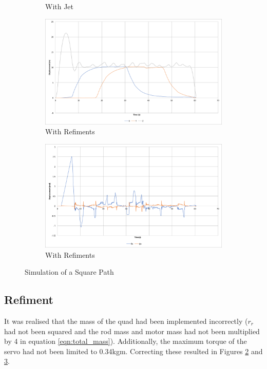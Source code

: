 \documentclass[11pt]{article}
\begin{document}
\begin{figure}[p]
\begin{subfigure}{0.48\textwidth}
        \caption{With Jet}
        \label{fig:square_path_w_jet_angle}
    \end{subfigure}
    \medskip
    \begin{subfigure}{0.48\textwidth}
        \includegraphics[width=\linewidth]{square_path_limited_servos}
        \caption{With Refiments}
        \label{fig:square_path_limited_servos}
    \end{subfigure}\hspace*{\fill}
    \begin{subfigure}{0.48\textwidth}
        \includegraphics[width=\linewidth]{square_path_limited_servos_angle}
        \caption{With Refiments}
        \label{fig:square_path_limited_servos_angle}
    \end{subfigure}

    \caption{Simulation of a Square Path}
    \label{fig:Square Path}
\end{figure}


\subsection{Refiment}
It was realised that the mass of the quad had been implemented incorrectly ($r_r$ had not been squared and the rod mass and motor mass had not been multiplied by 4 in equation \ref{eqn:total_mass}). Additionally, the maximum torque of the servo had not been limited to 0.34kgm. Correcting these resulted in Figures \ref{fig:square_path_limited_servos} and \ref{fig:square_path_limited_servos_angle}.
\end{document}
